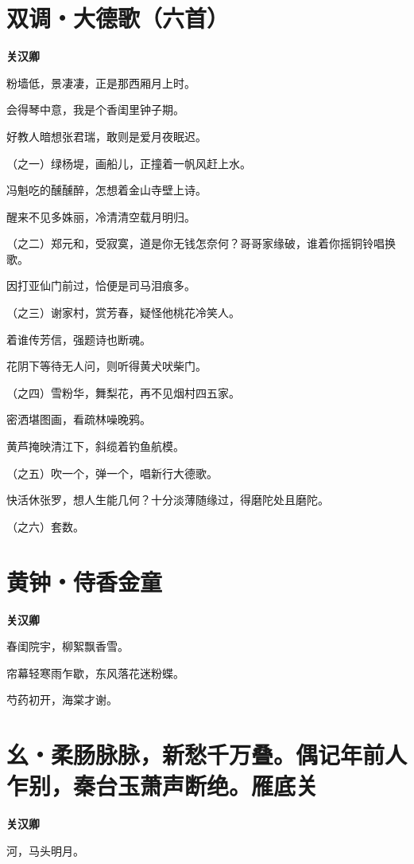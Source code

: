 \documentclass[12pt,a4paper]{ctexbook}
\begin{document}
\section{双调・大德歌（六首）}
\textbf{关汉卿}\par\vspace{0.5em}
粉墙低，景凄凄，正是那西厢月上时。\par
会得琴中意，我是个香闺里钟子期。\par
好教人暗想张君瑞，敢则是爱月夜眠迟。\par
（之一）绿杨堤，画船儿，正撞着一帆风赶上水。\par
冯魁吃的醺醺醉，怎想着金山寺壁上诗。\par
醒来不见多姝丽，冷清清空载月明归。\par
（之二）郑元和，受寂寞，道是你无钱怎奈何？哥哥家缘破，谁着你摇铜铃唱换歌。\par
因打亚仙门前过，恰便是司马泪痕多。\par
（之三）谢家村，赏芳春，疑怪他桃花冷笑人。\par
着谁传芳信，强题诗也断魂。\par
花阴下等待无人问，则听得黄犬吠柴门。\par
（之四）雪粉华，舞梨花，再不见烟村四五家。\par
密洒堪图画，看疏林噪晚鸦。\par
黄芦掩映清江下，斜缆着钓鱼航模。\par
（之五）吹一个，弹一个，唱新行大德歌。\par
快活休张罗，想人生能几何？十分淡薄随缘过，得磨陀处且磨陀。\par
（之六）套数。\par

\section{黄钟・侍香金童}
\textbf{关汉卿}\par\vspace{0.5em}
春闺院宇，柳絮飘香雪。\par
帘幕轻寒雨乍歇，东风落花迷粉蝶。\par
芍药初开，海棠才谢。\par

\section{幺・柔肠脉脉，新愁千万叠。偶记年前人乍别，秦台玉萧声断绝。雁底关}
\textbf{关汉卿}\par\vspace{0.5em}
河，马头明月。\par
\end{document}
